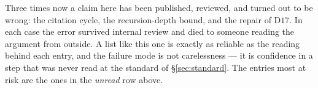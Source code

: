 \begin{entry}\label{ent:meta}
Three times now a claim here has been published, reviewed, and turned out to be
wrong: the citation cycle, the recursion-depth bound, and the repair of
$\mathrm D17$. In each case the error survived internal review and died to
someone reading the argument from outside. A list like this one is exactly as
reliable as the reading behind each entry, and the failure mode is not
carelessness --- it is confidence in a step that was never read at the standard
of \S\ref{sec:standard}. The entries most at risk are the ones in the
\emph{unread} row above.
\end{entry}
